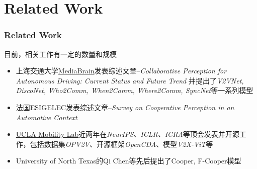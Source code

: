 \documentclass[8]{beamer}
\begin{document}
\section{Related Work}
\begin{frame}
    \frametitle{Related Work}
        目前，相关工作有一定的数量和规模
        \begin{itemize}
            \footnotesize
            \item 上海交通大学\href{https://mediabrain.sjtu.edu.cn/}{MediaBrain}发表综述文章--\textit{Collaborative Perception for Autonomous Driving: Current Status and Future Trend}\cite{ren2023collaborative}
            并提出了\textit{V2VNet, DiscoNet, Who2Comm, When2Comm, Where2Comm, SyncNet}等一系列模型
            \item 法国ESIGELEC发表综述文章--\textit{Survey on Cooperative Perception in an Automotive Context}\cite{caillot2022survey}
            \item \href{https://mobility-lab.seas.ucla.edu/}{UCLA Mobility Lab}近两年在\textit{NeurIPS、ICLR、ICRA}等顶会发表并开源工作，包括数据集\textit{OPV2V}\cite{xu2022opv2v}、开源框架\textit{OpenCDA}\cite{xu2021opencda}、模型\textit{V2X-ViT}\cite{xu2022v2x}等
            \item University of North Texas的Qi Chen等先后提出了Cooper, F-Cooper模型\cite{chen2019cooper,F-Cooper}
        \end{itemize}
\end{frame}
\end{document}
